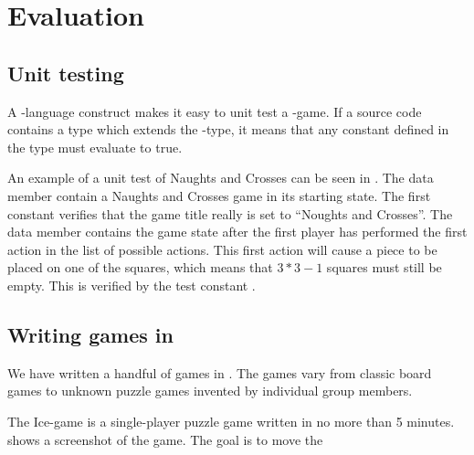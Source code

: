 \chapter{Evaluation}
\label{chap:evaluation}

\section{Unit testing}
A \productname{}-language construct makes it easy to unit test a \productname{}-game.
If a source code contains a type which extends the -type, it means that any constant defined in the type must evaluate to true.

An example of a unit test of Naughts and Crosses can be seen in .
The data member  contain a Naughts and Crosses game in its starting state.
The first constant  verifies that the game title really is set to ``Noughts and Crosses''.
The data member  contains the game state after the first player has 
performed the first action in the list of possible actions. This first action will cause a piece to be placed on one of the squares, which means 
that $3*3 - 1$ squares must still be empty. This is verified by the test constant .

\section{Writing games in \productname}
We have written a handful of games in \productname{}. The games vary from classic board games to unknown puzzle games invented by individual group members.

The Ice-game is a single-player puzzle game written in no more than 5 minutes. shows a screenshot of the game. The goal is to move the 


